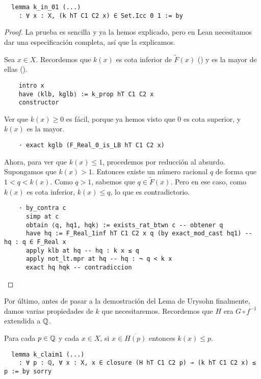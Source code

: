 \begin{lstlisting}
  lemma k_in_01 (...)
    : ∀ x : X, (k hT C1 C2 x) ∈ Set.Icc 0 1 := by
\end{lstlisting}

\begin{proof}
  La prueba es sencilla y ya la hemos explicado, pero en Lean necesitamos dar una especificación completa, así que la explicamos.

  Sea $x \in X$. Recordemos que $k(x)$ es cota inferior de $\tilde{F}(x)$ () y es la mayor de ellas ().

  \begin{lstlisting}
    intro x
    have ⟨klb, kglb⟩ := k_prop hT C1 C2 x
    constructor \end{lstlisting}

  Ver que $k(x) \geq 0$ es fácil, porque ya hemos visto que $0$ es cota superior, y $k(x)$ es la mayor.

  \begin{lstlisting}
    · exact kglb (F_Real_0_is_LB hT C1 C2 x) \end{lstlisting}

  Ahora, para ver que $k(x) \leq 1$, procedemos por reducción al absurdo. Supongamos que $k(x) > 1$. Entonces existe un número racional $q$ de forma que $1 < q < k(x)$. Como $q > 1$, sabemos que $q \in \tilde{F}(x)$. Pero en ese caso, como $k(x)$ es cota inferior, $k(x) \leq q$, lo que es contradictorio.

  \begin{lstlisting}
    · by_contra c
      simp at c
      obtain ⟨q, hq1, hqk⟩ := exists_rat_btwn c -- obtener q
      have hq := F_Real_1inf hT C1 C2 x q (by exact_mod_cast hq1) -- hq : q ∈ F_Real x
      apply klb at hq -- hq : k x ≤ q
      apply not_lt.mpr at hq -- hq : ¬ q < k x
      exact hq hqk -- contradiccion \end{lstlisting}
\end{proof}

Por último, antes de pasar a la demostración del Lema de Urysohn finalmente, damos varias propiedades de $k$ que necesitaremos. Recordemos que $H$ era $G \circ f^{-1}$ extendida a $\mathbb{Q}$.

\begin{lemma}\label{claim1}
  Para cada $p \in \mathbb{Q}$ y cada $x \in X$, si $x \in \overline{H(p)}$ entonces $k(x) \leq p$.
\end{lemma}

\begin{lstlisting}
  lemma k_claim1 (...)
    : ∀ p : ℚ, ∀ x : X, x ∈ closure (H hT C1 C2 p) → (k hT C1 C2 x) ≤ p := by sorry
\end{lstlisting}

